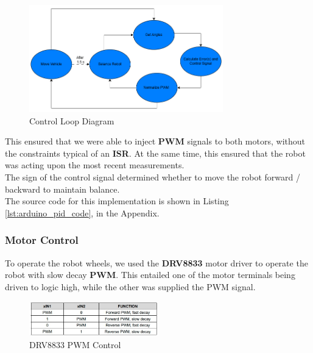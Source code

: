 \documentclass{article}
\begin{document}
\begin{figure}[H]
    \centering
    \includegraphics[width=0.75\textwidth]{Figures/Control_Loop_Diagram.png}
    \caption{Control Loop Diagram}
    \label{fig:control_loop_diagram}
\end{figure}

\begin{minipage}{\linewidth}
    This ensured that we were able to inject \textbf{PWM} signals to both motors, without the constraints typical of an \textbf{ISR}. At the same time,
    this ensured that the robot was acting upon the most recent measurements. \\

    The sign of the control signal determined whether to move the robot forward / backward to maintain balance. \\

    The source code for this implementation is shown in Listing \ref{lst:arduino_pid_code}, in the Appendix.
\end{minipage}

\subsubsection{Motor Control}

\begin{minipage}{\linewidth}
    To operate the robot wheels, we used the \textbf{DRV8833} motor driver to operate the robot with slow decay \textbf{PWM}.
    This entailed one of the motor terminals being driven to logic high, while the other was supplied the PWM signal. \\
\end{minipage}

\begin{figure}[H]
    \centering
    \includegraphics[width=0.5\textwidth]{Figures/PWM_Control.jpg}
    \caption{DRV8833 PWM Control}
    \label{fig:drv8833}
\end{figure}
\end{document}
